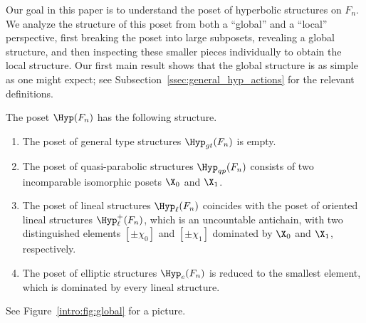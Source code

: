 Our goal in this paper is to understand the poset of hyperbolic structures on $F_n$. We analyze the structure of this poset from both a ``global'' and a ``local'' perspective, first breaking the poset into large subposets, revealing a global structure, and then inspecting these smaller pieces individually to obtain the local structure. Our first main result shows that the global structure is as simple as one might expect; see Subsection~\ref{ssec:general_hyp_actions} for the relevant definitions.

\begin{thmA}
\label{intro:thm:global}
The poset $\Hyp(F_n)$ has the following structure.
\begin{enumerate}
   \item The poset of general type structures $\Hyp_{gt}(F_n)$ is empty.
   \item The poset of quasi-parabolic structures $\Hyp_{qp}(F_n)$ consists of two incomparable isomorphic posets $\X_0$ and $\X_1$.
   \item The poset of lineal structures $\Hyp_{\ell}(F_n)$ coincides with the poset of oriented lineal structures $\Hyp_{\ell}^+(F_n)$, which is an uncountable antichain, with two distinguished elements $[\pm\chi_0]$ and $[\pm\chi_1]$ dominated by $\X_0$ and $\X_1$, respectively.
   \item The poset of elliptic structures $\Hyp_e(F_n)$ is reduced to the smallest element, which is dominated by every lineal structure.
\end{enumerate}
\end{thmA}

See Figure~\ref{intro:fig:global} for a picture.

